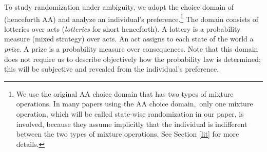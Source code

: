 \documentclass[12pt, notitlepage]{article}
\begin{document}
To study randomization under ambiguity, we adopt the choice domain of \cite%
{AA63} (henceforth AA) and analyze an individual's preference.\footnote{%
We use the original AA choice domain that has two types of mixture
operations. In many papers using the AA choice domain,\ only one mixture
operation, which will be called state-wise randomization in our paper, is
involved, because they assume implicitly that the individual is indifferent
between the two types of mixture operations. See Section \ref{lit} for more
details.} The domain consists of lotteries over acts (\textit{lotteries} for
short henceforth). A lottery is a probability measure (mixed strategy) over
acts. An act assigns to each state of the world a \textit{prize}. A prize is
a probability measure over consequences. Note that this domain does not
require us to describe objectively how the probability law is determined;
this will be subjective and revealed from the individual's preference.
\end{document}

